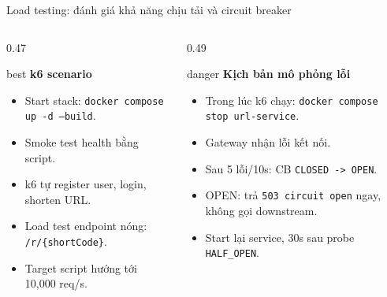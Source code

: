 \documentclass[aspectratio=169]{beamer}
\begin{document}
\begin{frame}{Load testing: đánh giá khả năng chịu tải và circuit breaker}
    \begin{columns}[T,onlytextwidth]
        \begin{column}{0.47\textwidth}
            \begin{claimbox}{best}
                \textbf{k6 scenario}
                \begin{itemize}\small
                    \item Start stack: \texttt{docker compose up -d --build}.
                    \item Smoke test health bằng script.
                    \item k6 tự register user, login, shorten URL.
                    \item Load test endpoint nóng: \texttt{/r/\{shortCode\}}.
                    \item Target script hướng tới 10,000 req/s.
                \end{itemize}
            \end{claimbox}
        \end{column}
        \begin{column}{0.49\textwidth}
            \begin{claimbox}{danger}
                \textbf{Kịch bản mô phỏng lỗi}
                \begin{itemize}\small
                    \item Trong lúc k6 chạy: \texttt{docker compose stop url-service}.
                    \item Gateway nhận lỗi kết nối.
                    \item Sau 5 lỗi/10s: CB \texttt{CLOSED -> OPEN}.
                    \item OPEN: trả \texttt{503 circuit open} ngay, không gọi downstream.
                    \item Start lại service, 30s sau probe \texttt{HALF\_OPEN}.
                \end{itemize}
            \end{claimbox}
        \end{column}
    \end{columns}
\end{frame}
\end{document}
